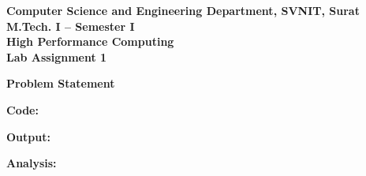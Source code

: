 \documentclass[12pt]{article}
\begin{document}

\begin{center}
\textbf{Computer Science and Engineering Department, SVNIT, Surat}\\
\textbf{M.Tech. I -- Semester I}\\
\textbf{High Performance Computing}\\
\textbf{Lab Assignment 1}
\end{center}

\vspace{0.4cm}

\textbf{Problem Statement}

\vspace{0.3cm}

\textbf{Code:}

\newpage

\textbf{Output:}

\newpage

\textbf{Analysis:}

\vspace{6cm}
\end{document}
